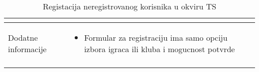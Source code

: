 \documentclass{article}
\begin{document}
\begin{longtable}{| p{} | p{} |}
\begin{itemize}
    \end{itemize}\\

\hline
    Dodatne informacije & \begin{itemize}
        \item Formular za registraciju ima samo opciju izbora igraca ili kluba i mogucnost potvrde
    \end{itemize} \\
\hline
\caption{Registacija neregistrovanog korisnika u okviru TS} %
\end{longtable}


\end{document}
